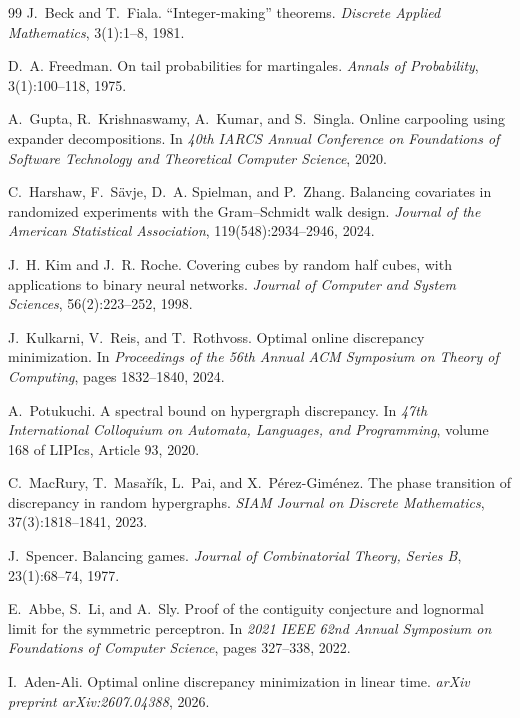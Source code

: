 \documentclass[reqno,english]{amsart}
\theoremstyle{definition}
\begin{document}
\begin{thebibliography}{99}
J.~Beck and T.~Fiala.
\newblock ``Integer-making'' theorems.
\newblock \emph{Discrete Applied Mathematics}, 3(1):1--8, 1981.

D.~A. Freedman.
\newblock On tail probabilities for martingales.
\newblock \emph{Annals of Probability}, 3(1):100--118, 1975.

A.~Gupta, R.~Krishnaswamy, A.~Kumar, and S.~Singla.
\newblock Online carpooling using expander decompositions.
\newblock In \emph{40th IARCS Annual Conference on Foundations of Software
Technology and Theoretical Computer Science}, 2020.

C.~Harshaw, F.~S\"avje, D.~A. Spielman, and P.~Zhang.
\newblock Balancing covariates in randomized experiments with the
Gram--Schmidt walk design.
\newblock \emph{Journal of the American Statistical Association},
119(548):2934--2946, 2024.

J.~H. Kim and J.~R. Roche.
\newblock Covering cubes by random half cubes, with applications to binary
neural networks.
\newblock \emph{Journal of Computer and System Sciences},
56(2):223--252, 1998.

J.~Kulkarni, V.~Reis, and T.~Rothvoss.
\newblock Optimal online discrepancy minimization.
\newblock In \emph{Proceedings of the 56th Annual ACM Symposium on Theory of
Computing}, pages 1832--1840, 2024.

A.~Potukuchi.
\newblock A spectral bound on hypergraph discrepancy.
\newblock In \emph{47th International Colloquium on Automata, Languages, and
Programming}, volume 168 of LIPIcs, Article 93, 2020.

C.~MacRury, T.~Masa\v{r}\'ik, L.~Pai, and X.~P\'erez-Gim\'enez.
\newblock The phase transition of discrepancy in random hypergraphs.
\newblock \emph{SIAM Journal on Discrete Mathematics}, 37(3):1818--1841, 2023.

J.~Spencer.
\newblock Balancing games.
\newblock \emph{Journal of Combinatorial Theory, Series B}, 23(1):68--74,
1977.

E.~Abbe, S.~Li, and A.~Sly.
\newblock Proof of the contiguity conjecture and lognormal limit for the symmetric perceptron.
\newblock In \emph{2021 IEEE 62nd Annual Symposium on Foundations of Computer Science}, pages 327--338, 2022.

I.~Aden-Ali.
\newblock Optimal online discrepancy minimization in linear time.
\newblock \emph{arXiv preprint arXiv:2607.04388}, 2026.


\end{thebibliography}
\end{document}
